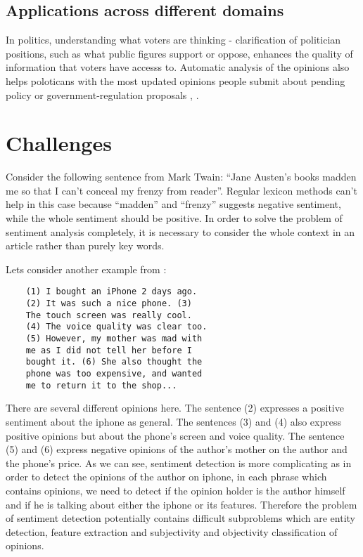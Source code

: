 \documentclass{article}
\begin{document}
\begin{multicols}{2}
    \subsection{Applications across different domains}
      In politics, understanding what voters are thinking - clarification
of politician positions, such as what public figures support or oppose, 
enhances the quality of information that voters have accesss to. Automatic 
analysis of the opinions also helps poloticans with the most updated opinions 
people submit about pending policy or government-regulation proposals 
\citet{Cynthia2006}, \citet{Kwon2006}.

\section{Challenges}
    Consider the following sentence from Mark Twain: ``Jane Austen's books
madden me so that I can't conceal my frenzy from reader''. Regular lexicon
methods can't help in this case because ``madden'' and ``frenzy'' suggests
negative sentiment, while the whole sentiment should be positive. In order to
solve the problem of sentiment analysis completely, it is necessary to consider
the whole context in an article rather than purely key words.
    
    Lets consider another example from \citet{Liu2010}:
    \begin{verbatim}
    (1) I bought an iPhone 2 days ago. 
    (2) It was such a nice phone. (3) 
    The touch screen was really cool. 
    (4) The voice quality was clear too. 
    (5) However, my mother was mad with 
    me as I did not tell her before I 
    bought it. (6) She also thought the 
    phone was too expensive, and wanted 
    me to return it to the shop...
    \end{verbatim}

    There are several different opinions here. The sentence (2) expresses
a positive sentiment about the iphone as general. The sentences (3) and
(4) also express positive opinions but about the phone's screen and voice
quality. The sentence (5) and (6) express negative opinions of the author's
mother on the author and the phone's price. As we can see, sentiment detection
is more complicating as in order to detect the opinions of the author on iphone,
in each phrase which contains opinions, we need to detect if the opinion holder
is the author himself and if he is talking about either the iphone or its
features. Therefore the problem of sentiment detection potentially contains
difficult subproblems which are entity detection, feature extraction
and subjectivity and objectivity classification of opinions.
  

\end{multicols}
\end{document}
